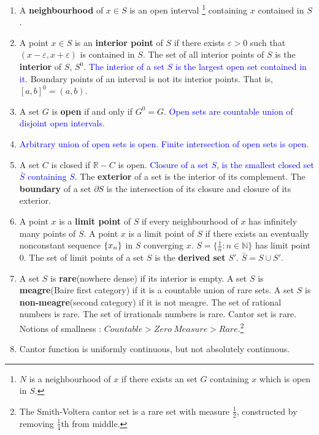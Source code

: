 \begin{enumerate}
	\item A \textbf{neighbourhood} of $x \in S$ is an open interval \footnote{$N$ is a neighbourhood of $x$ if there exists an set $G$ containing $x$ which is open in $S$.} containing $x$ contained in $S$.
	\item A point $x \in S$ is an \textbf{interior point} of $S$ if there exists $\varepsilon > 0$ such that $(x-\varepsilon, x+\varepsilon)$ is contained in $S$. The set of all interior points of $S$ is the \textbf{interior} of $S$, $S^0$. 
		\subitem \textcolor{blue}{The interior of a set $S$ is the largest open set contained in it.}
		\subitem Boundary points of an interval is not its interior points. That is, $[a,b]^0 = (a,b)$.
	\item A set $G$ is \textbf{open} if and only if $G^0 = G$.
		\subitem \textcolor{blue}{Open sets are countable union of disjoint open intervals.}
	\item \textcolor{blue}{Arbitrary union of open sets is open. Finite intersection of open sets is open.}
	\item A set $C$ is closed if $\mathbb{R}-C$ is open.
		\subitem \textcolor{blue}{Closure of a set $S$, is the smallest closed set $\bar{S}$ containing $S$.}
		\subitem The \textbf{exterior} of a set is the interior of its complement. The \textbf{boundary} of a set $\partial S$ is the intersection of its closure and closure of its exterior.
	\item A point $x$ is a \textbf{limit point} of $S$ if every neighbourhood of $x$ has infinitely many points of $S$.
		\subitem A point $x$ is a limit point of $S$ if there exists an eventually nonconstant sequence $\{x_n\}$ in $S$ converging $x$.
		\subitem $S = \{ \frac{1}{n} : n \in \mathbb{N} \}$ has limit point $0$.
		\subitem The set of limit points of a set $S$ is the \textbf{derived set} $S'$.
		\subitem $\bar{S} = S \cup S'$.
	\item A set $S$ is \textbf{rare}(nowhere dense) if its interior is empty. A set $S$ is \textbf{meagre}(Baire first category) if it is a countable union of rare sets. A set $S$ is \textbf{non-meagre}(second category) if it is not meagre.
		\subitem The set of rational numbers is rare.
		\subitem The set of irrationals numbers is rare.
		\subitem Cantor set is rare.  \subitem Notions of smallness : $Countable > Zero\ Measure > Rare$.\footnote{The Smith-Voltera cantor set is a rare set with measure $\frac{1}{2}$, constructed by removing $\frac{1}{4}$th from middle.} \item \subitem Cantor function is uniformly continuous, but not absolutely continuous.

\end{enumerate}
